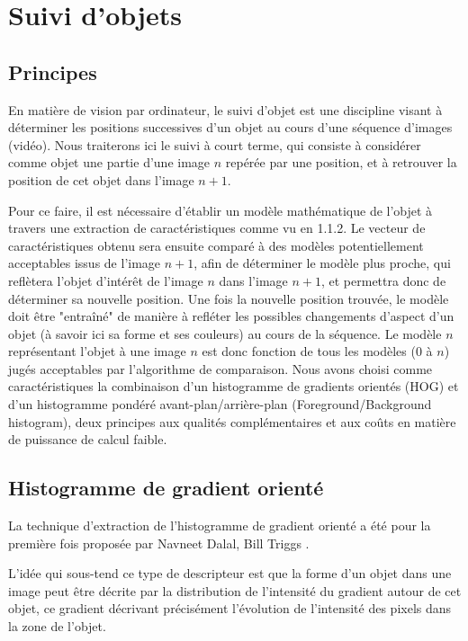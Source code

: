       \section{Suivi d'objets}
        \subsection{Principes}
        En matière de vision par ordinateur, le suivi d'objet est une discipline visant à déterminer les positions successives d'un objet au cours d'une séquence d'images (vidéo).
        Nous traiterons ici le suivi à court terme, qui consiste à considérer comme objet une partie d'une image $n$ repérée par une position, et à retrouver la position de cet objet dans l'image $n+1$.
        
        Pour ce faire, il est nécessaire d'établir un modèle mathématique de l'objet à travers une extraction de caractéristiques comme vu en 1.1.2.
        Le vecteur de caractéristiques obtenu sera ensuite comparé à des modèles potentiellement acceptables issus de l'image $n+1$, afin de déterminer le modèle plus proche, qui reflètera l'objet d'intérêt de l'image $n$ dans l'image $n+1$, et permettra donc de déterminer sa nouvelle position.
        Une fois la nouvelle position trouvée, le modèle doit être "entraîné" de manière à refléter les possibles changements d'aspect d'un objet (à savoir ici sa forme et ses couleurs) au cours de la séquence.
        Le modèle $n$ représentant l'objet à une image $n$ est donc fonction de tous les modèles ($0$ à $n$) jugés acceptables par l'algorithme de comparaison.
        Nous avons choisi comme caractéristiques la combinaison d'un histogramme de gradients orientés (HOG) et d'un histogramme pondéré avant-plan/arrière-plan (Foreground/Background histogram), deux principes aux qualités complémentaires et aux coûts en matière de puissance de calcul faible.
        
        \subsection{Histogramme de gradient orienté}
        La technique d'extraction de l'histogramme de gradient orienté a été pour la première fois proposée par Navneet Dalal, Bill Triggs \cite{Bib_HOG}.

        L'idée qui sous-tend ce type de descripteur est que la forme d'un objet dans une image peut être décrite par la distribution de l'intensité du gradient autour de cet objet, ce gradient décrivant précisément l'évolution de l'intensité des pixels dans la zone de l'objet.
        
